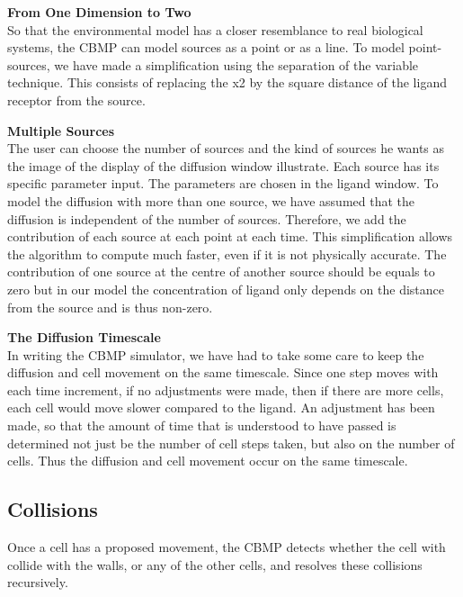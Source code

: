 \documentclass[12pt]{article}
\begin{document}
{\bfseries From One Dimension to Two} \\
So that the environmental model has a closer resemblance to real 
biological systems, the CBMP can model sources as a point or as a line. 
To model point-sources, we have made a simplification using the 
separation of the variable technique. This consists of replacing the x2 
by the square distance of the ligand receptor from the source.

{\bfseries Multiple Sources} \\
The user can choose the number of sources and the kind of sources he 
wants as the image of the display of the diffusion window illustrate. 
Each source has its specific parameter input. The parameters are chosen 
in the ligand window. To model the diffusion with more than one source, 
we have assumed that the diffusion is independent of the number of 
sources. Therefore, we add the contribution of each source at each point 
at each time. This simplification allows the algorithm to compute much 
faster, even if it is not physically accurate. The contribution of one 
source at the centre of another source should be equals to zero but in 
our model the concentration of ligand only depends on the distance from 
the source and is thus non-zero. 

{\bfseries The Diffusion Timescale} \\
In writing the CBMP simulator, we have had to take some care to keep the 
diffusion and cell movement on the same timescale. Since one step moves 
with each time increment, if no adjustments were made, then if there are 
more cells, each cell would move slower compared to the ligand. An 
adjustment has been made, so that the amount of time that is understood 
to have passed is determined not just be the number of cell steps taken, 
but also on the number of cells. Thus the diffusion and cell movement 
occur on the same timescale.

\subsection{Collisions}
  Once a cell has a proposed movement, the CBMP 
detects whether the cell with collide with the walls, or any of the 
other cells, and resolves these collisions recursively.
\end{document}
